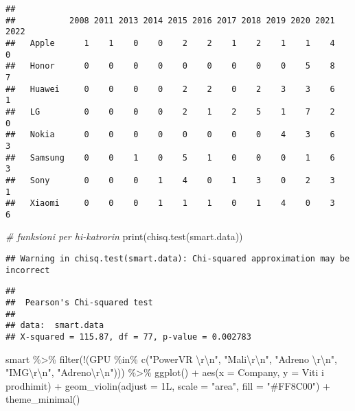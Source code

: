 \documentclass[
]{article}
\newenvironment{Shaded}{\begin{snugshade}}{\end{snugshade}}
\newcommand{\AttributeTok}[1]{\textcolor[rgb]{0.77,0.63,0.00}{#1}}
\newcommand{\CommentTok}[1]{\textcolor[rgb]{0.56,0.35,0.01}{\textit{#1}}}
\newcommand{\FunctionTok}[1]{\textcolor[rgb]{0.00,0.00,0.00}{#1}}
\newcommand{\NormalTok}[1]{#1}
\newcommand{\SpecialCharTok}[1]{\textcolor[rgb]{0.00,0.00,0.00}{#1}}
\newcommand{\StringTok}[1]{\textcolor[rgb]{0.31,0.60,0.02}{#1}}
\begin{document}
\begin{verbatim}
##          
##           2008 2011 2013 2014 2015 2016 2017 2018 2019 2020 2021 2022
##   Apple      1    1    0    0    2    2    1    2    1    1    4    0
##   Honor      0    0    0    0    0    0    0    0    0    5    8    7
##   Huawei     0    0    0    0    2    2    0    2    3    3    6    1
##   LG         0    0    0    0    2    1    2    5    1    7    2    0
##   Nokia      0    0    0    0    0    0    0    0    4    3    6    3
##   Samsung    0    0    1    0    5    1    0    0    0    1    6    3
##   Sony       0    0    0    1    4    0    1    3    0    2    3    1
##   Xiaomi     0    0    0    1    1    1    0    1    4    0    3    6
\end{verbatim}

\begin{Shaded}
\begin{Highlighting}[]
\CommentTok{\# funksioni per hi{-}katrorin}
\FunctionTok{print}\NormalTok{(}\FunctionTok{chisq.test}\NormalTok{(smart.data))}
\end{Highlighting}
\end{Shaded}

\begin{verbatim}
## Warning in chisq.test(smart.data): Chi-squared approximation may be incorrect
\end{verbatim}

\begin{verbatim}
## 
##  Pearson's Chi-squared test
## 
## data:  smart.data
## X-squared = 115.87, df = 77, p-value = 0.002783
\end{verbatim}

\begin{Shaded}
\begin{Highlighting}[]
\NormalTok{smart }\SpecialCharTok{\%\textgreater{}\%}
 \FunctionTok{filter}\NormalTok{(}\SpecialCharTok{!}\NormalTok{(GPU }\SpecialCharTok{\%in\%} \FunctionTok{c}\NormalTok{(}\StringTok{"PowerVR }\SpecialCharTok{\textbackslash{}r\textbackslash{}n}\StringTok{"}\NormalTok{, }\StringTok{"Mali}\SpecialCharTok{\textbackslash{}r\textbackslash{}n}\StringTok{"}\NormalTok{, }\StringTok{"Adreno }\SpecialCharTok{\textbackslash{}r\textbackslash{}n}\StringTok{"}\NormalTok{, }\StringTok{"IMG}\SpecialCharTok{\textbackslash{}r\textbackslash{}n}\StringTok{"}\NormalTok{, }\StringTok{"Adreno}\SpecialCharTok{\textbackslash{}r\textbackslash{}n}\StringTok{"}\NormalTok{))) }\SpecialCharTok{\%\textgreater{}\%}
 \FunctionTok{ggplot}\NormalTok{() }\SpecialCharTok{+}
  \FunctionTok{aes}\NormalTok{(}\AttributeTok{x =}\NormalTok{ Company, }\AttributeTok{y =} \StringTok{\textasciigrave{}}\AttributeTok{Viti i prodhimit}\StringTok{\textasciigrave{}}\NormalTok{) }\SpecialCharTok{+}
  \FunctionTok{geom\_violin}\NormalTok{(}\AttributeTok{adjust =}\NormalTok{ 1L, }\AttributeTok{scale =} \StringTok{"area"}\NormalTok{, }\AttributeTok{fill =} \StringTok{"\#FF8C00"}\NormalTok{) }\SpecialCharTok{+}
  \FunctionTok{theme\_minimal}\NormalTok{()}
\end{Highlighting}
\end{Shaded}
\end{document}
